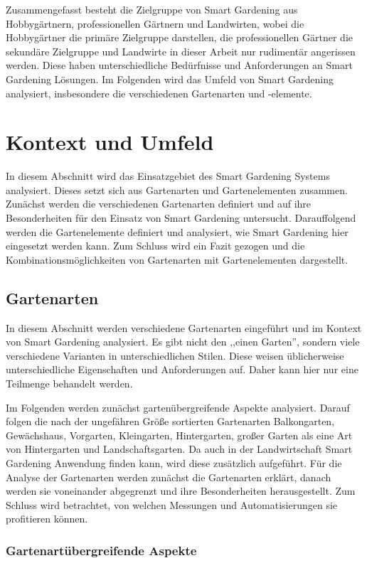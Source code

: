 Zusammengefasst besteht die Zielgruppe von Smart Gardening aus Hobbygärtnern, professionellen Gärtnern und Landwirten, wobei die Hobbygärtner die primäre Zielgruppe darstellen, die professionellen Gärtner die sekundäre Zielgruppe und Landwirte in dieser Arbeit nur rudimentär angerissen werden.
Diese haben unterschiedliche Bedürfnisse und Anforderungen an Smart Gardening Lösungen.
Im Folgenden wird das Umfeld von Smart Gardening analysiert, insbesondere die verschiedenen Gartenarten und -elemente.



\section{Kontext und Umfeld}
In diesem Abschnitt wird das Einsatzgebiet des Smart Gardening Systems analysiert.
Dieses setzt sich aus Gartenarten und Gartenelementen zusammen.
Zunächst werden die verschiedenen Gartenarten definiert und auf ihre Besonderheiten für den Einsatz von Smart Gardening untersucht.
Darauffolgend werden die Gartenelemente definiert und analysiert, wie Smart Gardening hier eingesetzt werden kann.
Zum Schluss wird ein Fazit gezogen und die Kombinationsmöglichkeiten von Gartenarten mit Gartenelementen dargestellt.

\subsection{Gartenarten}
In diesem Abschnitt werden verschiedene Gartenarten eingeführt und im Kontext von Smart Gardening analysiert.
Es gibt nicht den ,,einen Garten'', sondern viele verschiedene Varianten in unterschiedlichen Stilen.
Diese weisen üblicherweise unterschiedliche Eigenschaften und Anforderungen auf.
Daher kann hier nur eine Teilmenge behandelt werden.

Im Folgenden werden zunächst gartenübergreifende Aspekte analysiert.
Darauf folgen die nach der ungefähren Größe sortierten Gartenarten Balkongarten, Gewächshaus, Vorgarten, Kleingarten, Hintergarten, großer Garten als eine Art von Hintergarten und Landschaftsgarten.
Da auch in der Landwirtschaft Smart Gardening Anwendung finden kann, wird diese zusätzlich aufgeführt.
Für die Analyse der Gartenarten werden zunächst die Gartenarten erklärt, danach werden sie voneinander abgegrenzt und ihre Besonderheiten herausgestellt.
Zum Schluss wird betrachtet, von welchen Messungen und Automatisierungen sie profitieren können.

\subsubsection{Gartenartübergreifende Aspekte}

